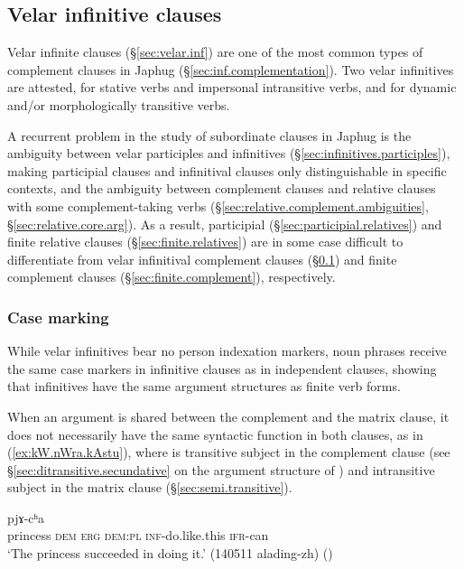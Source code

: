 \subsection{Velar infinitive clauses} \label{sec:velar.infinitives.complement.clauses}
Velar infinite clauses (§\ref{sec:velar.inf}) are one of the most common types of complement clauses in Japhug (§\ref{sec:inf.complementation}). Two velar infinitives are attested,  for stative verbs and impersonal intransitive verbs, and  for dynamic and/or morphologically transitive verbs. 

A recurrent problem in the study of subordinate clauses in Japhug is the ambiguity between velar participles and infinitives (§\ref{sec:infinitives.participles}), making participial clauses and infinitival clauses only distinguishable in specific contexts, and the ambiguity between complement clauses and relative clauses with some complement-taking verbs (§\ref{sec:relative.complement.ambiguities}, §\ref{sec:relative.core.arg}). As a result, participial (§\ref{sec:participial.relatives}) and finite  relative clauses  (§\ref{sec:finite.relatives}) are in some case difficult to differentiate from velar infinitival complement clauses (§\ref{sec:velar.infinitives.complement.clauses}) and finite complement clauses  (§\ref{sec:finite.complement}), respectively. 


\subsubsection{Case marking} \label{sec:case.infinitive}
While velar infinitives bear no person indexation markers, noun phrases receive the same case markers in infinitive clauses as in independent clauses, showing that infinitives have the same argument structures as finite verb forms.

When an argument is shared between the complement and the matrix clause, it does not necessarily have the same syntactic function in both clauses, as in (\ref{ex:kW.nWra.kAstu}), where  is transitive subject in the complement clause (see §\ref{sec:ditransitive.secundative} on the argument structure of ) and intransitive subject in the matrix clause (§\ref{sec:semi.transitive}). 

\begin{exe}
\ex \label{ex:kW.nWra.kAstu}
 pjɤ-cʰa \\
princess \textsc{dem} \textsc{erg} \textsc{dem}:\textsc{pl} \textsc{inf}-do.like.this \textsc{ifr}-can \\
\glt `The princess succeeded in doing it.' (140511 alading-zh)
()
\end{exe}

